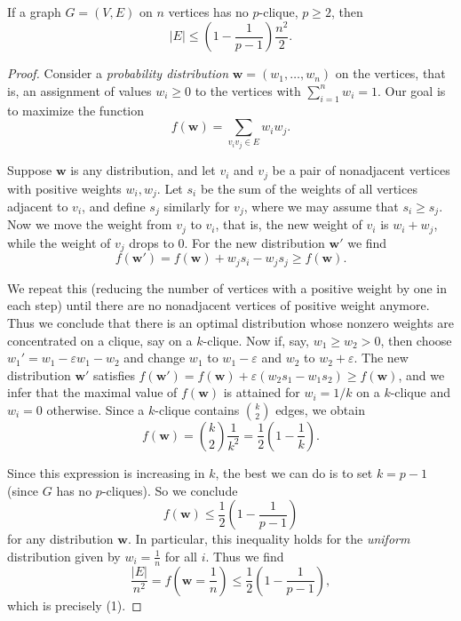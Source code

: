 \begin{theorem}
  \label{ch41proof3}
If a graph $G = (V, E)$ on $n$ vertices has no $p$-clique, $p \geq 2$, then
\[
|E| \leq \left(1 - \frac{1}{p - 1}\right) \frac{n^2}{2}. \tag{1}
\]
\end{theorem}
\begin{proof}
Consider a \emph{probability distribution} $\mathbf{w} = (w_1, \dots, w_n)$ on the vertices,
that is, an assignment of values $w_i \geq 0$ to the vertices with $\sum_{i=1}^n w_i = 1$.
Our goal is to maximize the function
\[
f(\mathbf{w}) = \sum_{v_i v_j \in E} w_i w_j.
\]

Suppose $\mathbf{w}$ is any distribution, and let $v_i$ and $v_j$ be a pair of nonadjacent
vertices with positive weights $w_i, w_j$. Let $s_i$ be the sum of the weights of all vertices
adjacent to $v_i$, and define $s_j$ similarly for $v_j$, where we may assume that $s_i \geq s_j$.
Now we move the weight from $v_j$ to $v_i$, that is, the new weight of $v_i$ is $w_i + w_j$,
while the weight of $v_j$ drops to 0. For the new distribution $\mathbf{w'}$ we find
\[
f(\mathbf{w'}) = f(\mathbf{w}) + w_j s_i - w_j s_j \geq f(\mathbf{w}).
\]

We repeat this (reducing the number of vertices with a positive weight by one in each step) until
there are no nonadjacent vertices of positive weight anymore. Thus we conclude that there is an
optimal distribution whose nonzero weights are concentrated on a clique, say on a $k$-clique.
Now if, say, $w_1 \geq w_2 > 0$, then choose $w_1' = w_1 - \varepsilon w_1 - w_2$ and
change $w_1$ to $w_1 - \varepsilon$ and $w_2$ to $w_2 + \varepsilon$. The new distribution
$\mathbf{w'}$ satisfies
$f(\mathbf{w'}) = f(\mathbf{w}) + \varepsilon (w_2 s_1 - w_1 s_2) \geq f(\mathbf{w})$, and we infer
that the maximal value of $f(\mathbf{w})$ is attained for $w_i = 1/k$ on a $k$-clique and $w_i = 0$
otherwise. Since a $k$-clique contains $\binom{k}{2}$ edges, we obtain
\[
f(\mathbf{w}) = \binom{k}{2} \frac{1}{k^2} = \frac{1}{2} \left(1 - \frac{1}{k}\right).
\]

Since this expression is increasing in $k$, the best we can do is to set $k = p - 1$
(since $G$ has no $p$-cliques). So we conclude
\[
f(\mathbf{w}) \leq \frac{1}{2} \left(1 - \frac{1}{p - 1}\right)
\]
for any distribution $\mathbf{w}$. In particular, this inequality holds for the \emph{uniform}
distribution given by $w_i = \frac{1}{n}$ for all $i$. Thus we find
\[
\frac{|E|}{n^2} = f\left(\mathbf{w} = \frac{1}{n}\right) \leq \frac{1}{2} \left(1 - \frac{1}{p - 1}\right),
\]
which is precisely (1).
\end{proof}


